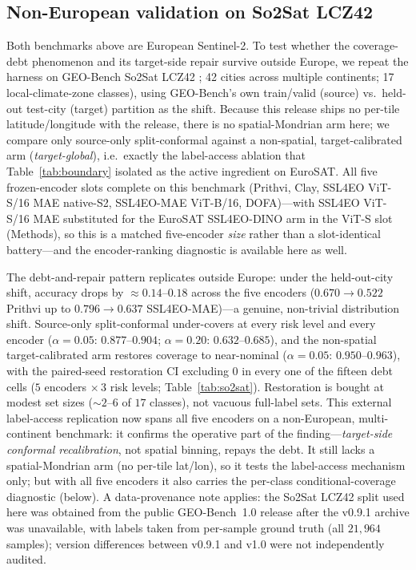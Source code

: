 \documentclass[preprint,11pt,authoryear]{elsarticle}
\begin{document}
\subsection*{Non-European validation on So2Sat LCZ42}
Both benchmarks above are European Sentinel-2. To test whether the coverage-debt phenomenon and its
target-side repair survive outside Europe, we repeat the harness on GEO-Bench \citep{lacoste2023geobench}
So2Sat LCZ42 \citep{zhu2020so2sat}; 42 cities across multiple continents; 17 local-climate-zone classes),
using GEO-Bench's own train/valid (source) vs.\ held-out test-city (target) partition as the shift. Because
this release ships no per-tile latitude/longitude with the release, there is no spatial-Mondrian arm here;
we compare only source-only split-conformal against a non-spatial, target-calibrated arm
(\emph{target-global}), i.e.\ exactly the label-access ablation that Table~\ref{tab:boundary} isolated as the
active ingredient on EuroSAT. All five frozen-encoder slots complete on this benchmark (Prithvi, Clay,
SSL4EO ViT-S/16 MAE native-S2, SSL4EO-MAE ViT-B/16, DOFA)---with SSL4EO ViT-S/16 MAE substituted
for the EuroSAT SSL4EO-DINO arm in the ViT-S slot (Methods), so this is a matched five-encoder
\emph{size} rather than a slot-identical battery---and the encoder-ranking diagnostic is
available here as well.

The debt-and-repair pattern replicates outside Europe: under the held-out-city shift, accuracy
drops by ${\approx}0.14$--$0.18$ across the five encoders ($0.670\to0.522$ Prithvi up to $0.796\to0.637$
SSL4EO-MAE)---a genuine, non-trivial distribution shift.
Source-only split-conformal under-covers at every risk level and every encoder ($\alpha=0.05$: $0.877$--$0.904$;
$\alpha=0.20$: $0.632$--$0.685$), and the non-spatial target-calibrated arm restores coverage to
near-nominal ($\alpha=0.05$: $0.950$--$0.963$), with the paired-seed restoration CI
excluding $0$ in every one of the fifteen debt cells ($5$ encoders ${\times}\,3$ risk levels; Table~\ref{tab:so2sat}). Restoration is bought at modest set sizes
(${\sim}2$--$6$ of $17$ classes), not vacuous full-label sets. This external label-access
replication now spans all five encoders on a non-European, multi-continent benchmark: it confirms the operative part of the
finding---\emph{target-side conformal recalibration}, not spatial binning, repays the debt. It still lacks a
spatial-Mondrian arm (no per-tile lat/lon), so it tests the label-access mechanism only; but with all
five encoders it also carries the per-class conditional-coverage diagnostic (below). A data-provenance note applies: the So2Sat LCZ42 split used here
was obtained from the public GEO-Bench~1.0 release after the v0.9.1 archive was unavailable,
with labels taken from per-sample ground truth (all $21{,}964$ samples);
version differences between v0.9.1 and v1.0 were not independently audited.
\end{document}

